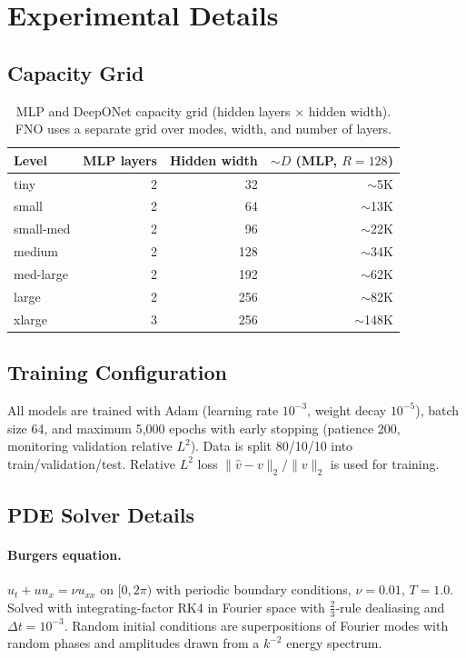 \documentclass[11pt]{article}
\begin{document}
\appendix
\section{Experimental Details}
\label{app:details}

\subsection{Capacity Grid}

\begin{table}[h]
\centering
\caption{MLP and DeepONet capacity grid (hidden layers $\times$ hidden
width). FNO uses a separate grid over modes, width, and number of
layers.}
\label{tab:capacity-grid}
\begin{tabular}{@{}lrrr@{}}
\toprule
\textbf{Level} & \textbf{MLP layers} & \textbf{Hidden width} &
\textbf{$\sim D$ (MLP, $R\!=\!128$)} \\
\midrule
tiny      & 2 & 32  & $\sim$5K \\
small     & 2 & 64  & $\sim$13K \\
small-med & 2 & 96  & $\sim$22K \\
medium    & 2 & 128 & $\sim$34K \\
med-large & 2 & 192 & $\sim$62K \\
large     & 2 & 256 & $\sim$82K \\
xlarge    & 3 & 256 & $\sim$148K \\
\bottomrule
\end{tabular}
\end{table}

\subsection{Training Configuration}
All models are trained with Adam (learning rate $10^{-3}$, weight decay
$10^{-5}$), batch size 64, and maximum 5{,}000 epochs with early
stopping (patience 200, monitoring validation relative $L^2$). Data is
split 80/10/10 into train/validation/test. Relative $L^2$ loss
$\|\hat{v} - v\|_2 / \|v\|_2$ is used for training.

\subsection{PDE Solver Details}

\paragraph{Burgers equation.}
$u_t + u u_x = \nu u_{xx}$ on $[0, 2\pi)$ with periodic boundary
conditions, $\nu = 0.01$, $T = 1.0$. Solved with integrating-factor
RK4 in Fourier space with $\frac{2}{3}$-rule dealiasing and
$\Delta t = 10^{-3}$. Random initial conditions are superpositions of
Fourier modes with random phases and amplitudes drawn from a $k^{-2}$
energy spectrum.
\end{document}
